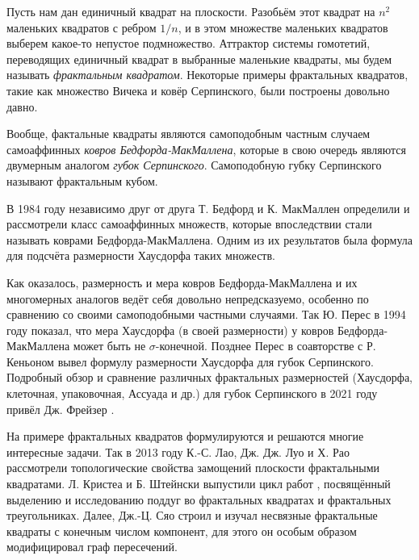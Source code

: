 Пусть нам дан единичный квадрат на плоскости.
Разобьём этот квадрат на $n^2$ маленьких квадратов с ребром $1/n$, и в этом множестве маленьких квадратов выберем какое-то непустое подмножество.
Аттрактор системы гомотетий, переводящих единичный квадрат в выбранные маленькие квадраты, мы будем называть {\em фрактальным квадратом}.
Некоторые примеры фрактальных квадратов, такие как множество Вичека и ковёр Серпинского, были построены довольно давно.

Вообще, фактальные квадраты являются самоподобным частным случаем самоаффинных {\em ковров Бедфорда-МакМаллена}, которые в свою очередь являются двумерным аналогом {\em губок Серпинского}.
Самоподобную губку Серпинского называют фрактальным кубом.




В 1984 году независимо друг от друга Т. Бедфорд \cite{Bedford1984} и К. МакМаллен \cite{McMullen1984} определили и рассмотрели класс самоаффинных множеств, которые впоследствии стали называть коврами Бедфорда-МакМаллена.
Одним из их результатов была формула для подсчёта размерности Хаусдорфа таких множеств.

Как оказалось, размерность и мера ковров Бедфорда-МакМаллена и их многомерных аналогов ведёт себя довольно непредсказуемо, особенно по сравнению со своими самоподобными частными случаями.
Так Ю. Перес \cite{Peres1994} в 1994 году показал, что мера Хаусдорфа (в своей размерности) у ковров Бедфорда-МакМаллена может быть не $\sigma$-конечной.
Позднее Перес в соавторстве с Р. Кеньоном \cite{KenyonPeres1996} вывел формулу размерности Хаусдорфа для губок Серпинского.
Подробный обзор и сравнение различных фрактальных размерностей (Хаусдорфа, клеточная, упаковочная, Ассуада и др.) для губок Серпинского в 2021 году привёл Дж. Фрейзер \cite{Fraser_2021}.

На примере фрактальных квадратов формулируются и решаются многие интересные задачи. 
Так в 2013 году К.-С. Лао, Дж. Дж. Луо и Х. Рао \cite{LLR2013} рассмотрели топологические свойства замощений плоскости фрактальными квадратами.
Л. Кристеа и Б. Штейнски выпустили цикл работ \cite{CS1,CS2,CS3}, посвящённый выделению и исследованию поддуг во фрактальных квадратах и фрактальных треугольниках.
Далее, Дж.-Ц. Сяо \cite{Xiao2021} строил и изучал несвязные фрактальные квадраты с конечным числом компонент, для этого он особым образом модифицировал граф пересечений.



